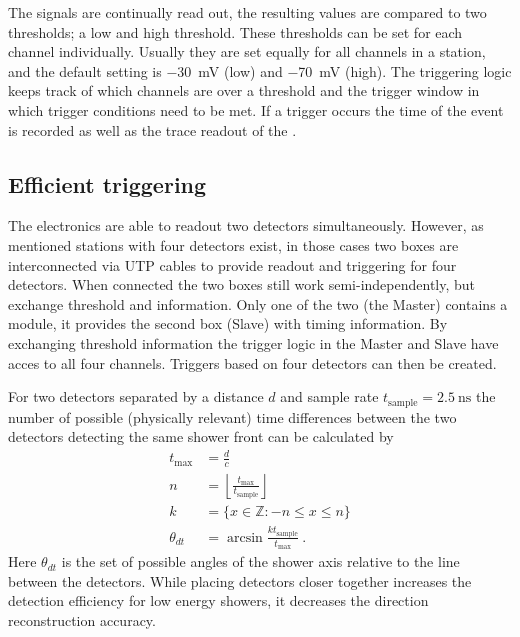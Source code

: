 The \pmt signals are continually read out, the resulting \adc values are compared to two thresholds; a low and high threshold. These thresholds can be set for each channel individually. Usually they are set equally for all channels in a station, and the default setting is \SI{-30}{\milli\volt} (low) and \SI{-70}{\milli\volt} (high). The triggering logic keeps track of which channels are over a threshold and the trigger window in which trigger conditions need to be met. If a trigger occurs the time of the event is recorded as well as the trace readout of the \adc.

\subsection{Efficient triggering}

The \hisparc electronics are able to readout two detectors simultaneously. However, as mentioned stations with four detectors exist, in those cases two boxes are interconnected via UTP cables to provide readout and triggering for four detectors. When connected the two boxes still work semi-independently, but exchange threshold and \gps information. Only one of the two (the Master) contains a \gps module, it provides the second box (Slave) with \gps timing information. By exchanging threshold information the trigger logic in the Master and Slave have acces to all four channels. Triggers based on four detectors can then be created.

For two detectors separated by a distance $d$ and sample rate $t_{\mathrm{sample}} = \SI{2.5}{\ns}$ the number of possible (physically relevant) time differences between the two detectors detecting the same shower front can be calculated by
%
\begin{equation}
    \begin{split}
        t_{\mathrm{max}} &= \frac{d}{c} \\
        n &= \left\lfloor \frac{t_{\mathrm{max}}}{t_{\mathrm{sample}}} \right\rfloor \\
        k &= \{x \in \mathbb{Z} : -n \leq x \leq n \} \\
        \theta_{dt} &= \arcsin \frac{k t_{\mathrm{sample}}}{t_{\mathrm{max}}} \ .
    \end{split}
\end{equation}
%
Here $\theta_{dt}$ is the set of possible angles of the shower axis relative to the line between the detectors. While placing detectors closer together increases the detection efficiency for low energy showers, it decreases the direction reconstruction accuracy.

